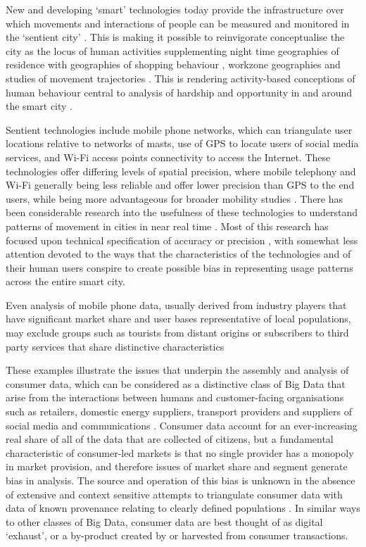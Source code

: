 New and developing ‘smart’ technologies today provide the infrastructure over
which movements and interactions of people can be measured and monitored in the
‘sentient city’ \citep{amin2017seeing}. This is making it possible to
reinvigorate conceptualise the city as the locus of human activities
supplementing night time geographies of residence \citep{martin2015developing}
with geographies of shopping behaviour \citep{lloyd2018detecting}, workzone
geographies \citep{singleton2018london} and studies of movement trajectories
\citep{campbell2008transforming}. This is rendering activity-based conceptions
of human behaviour central to analysis of hardship and opportunity in and
around the smart city \citep{venerandi2015measuring}.

Sentient technologies include mobile phone networks, which can triangulate user
locations relative to networks of masts, use of GPS to locate users of social
media services, and Wi-Fi access points connectivity to access the Internet.
These technologies offer differing levels of spatial precision, where mobile
telephony and Wi-Fi generally being less reliable and offer lower precision
than GPS to the end users, while being more advantageous for broader mobility
studies \citep{pinelli2015comparing}. There has been considerable research into
the usefulness of these technologies to understand patterns of movement in
cities in near real time \citep{candia2008uncovering,
gonzalez2008understanding, calabrese2013understanding}.  Most of this research
has focused upon technical specification of accuracy or precision
\citep{song2010limits,lane2010survey}, with somewhat less attention devoted to
the ways that the characteristics of the technologies and of their human users
conspire to create possible bias in representing usage patterns across the
entire smart city. 

Even analysis of mobile phone data, usually derived from industry players that
have significant market share and user bases representative of local
populations, may exclude groups such as tourists from distant origins or
subscribers to third party services that share distinctive characteristics
\citep{di2016mind}

These examples illustrate the issues that underpin the assembly and analysis of
consumer data, which can be considered as a distinctive class of Big Data that
arise from the interactions between humans and customer-facing organisations
such as retailers, domestic energy suppliers, transport providers and suppliers
of social media and communications \citep{cdrc2018consumer}.  Consumer data
account for an ever-increasing real share of all of the data that are collected
of citizens, but a fundamental characteristic of consumer-led markets is that
no single provider has a monopoly in market provision, and therefore issues of
market share and segment generate bias in analysis.  The source and operation
of this bias is unknown in the absence of extensive and context sensitive
attempts to triangulate consumer data with data of known provenance relating to
clearly defined populations \citep{lansley2016deriving}.  In similar ways to
other classes of Big Data, consumer data are best thought of as digital
‘exhaust’, or a by-product created by or harvested from consumer transactions.

